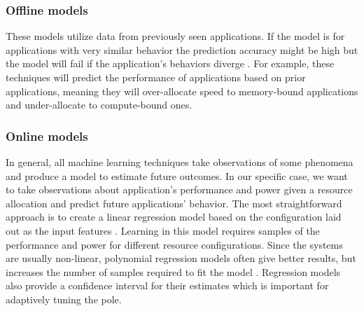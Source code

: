 \subsubsection{Offline models}
These models utilize data from previously seen applications. If the
model is for applications with very similar behavior the prediction
accuracy might be high but the model will fail if the application's
behaviors diverge \cite{meisnerISCA2011,Kim2014}.  For example, these
techniques will predict the performance of applications based on prior
applications, meaning they will over-allocate speed to memory-bound
applications and under-allocate to compute-bound ones.

\subsubsection{Online models}
In general, all machine learning techniques take observations of some
phenomena and produce a model to estimate future outcomes.  In our
specific case, we want to take observations about application's
performance and power given a resource allocation and predict future
applications' behavior.  The most straightforward approach is to
create a linear regression model based on the configuration laid out
as the input features
\cite{tibshirani1996regression,yuan2006model,CPR}.  Learning in this
model requires samples of the performance and power for different
resource configurations.  Since the systems are usually non-linear,
polynomial regression models often give better results, but increases
the number of samples required to fit the model \cite{LeeBrooks}.
Regression models also provide a confidence interval for their
estimates which is important for adaptively tuning the pole.


